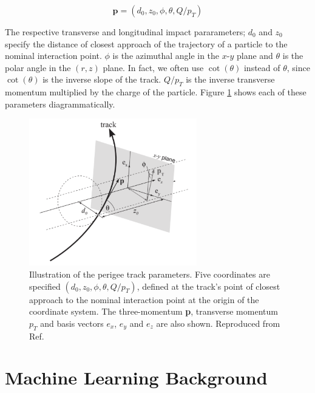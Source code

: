 \begin{equation}\label{perigee}
\textbf{p} = (d_0, z_0, \phi, \theta, Q/p_T)
\end{equation}

The respective transverse and longitudinal impact pararameters; $d_0$ and $z_0$ specify the distance of closest approach of the trajectory of a particle to the nominal interaction point. $\phi$ is the azimuthal angle in the $x$-$y$ plane and $\theta$ is the polar angle in the $(r,z)$ plane. In fact, we often use $\cot(\theta)$ instead of $\theta$, since $\cot(\theta)$ is the inverse slope of the track. $Q/p_T$ is the inverse transverse momentum multiplied by the charge of the particle. Figure \ref{fig:track-parameters-perigee} shows each of these parameters diagrammatically.


\begin{figure}[!htbp]
  \centering
  \includegraphics[width=0.65\textwidth]{images/3-track-reconstruction/track_params.pdf}
  \caption{Illustration of the perigee track parameters. Five coordinates are specified $(d_0, z_0, \phi, \theta, Q/p_T)$, defined at the track’s point of closest approach to the nominal interaction point at the origin of the coordinate system. The three-momentum \textbf{p}, transverse momentum $p_T$ and basis vectors $e_x$, $e_y$ and $e_z$ are also shown. Reproduced from Ref. \cite{atlastrackingdocs}
  }
  \label{fig:track-parameters-perigee}
\end{figure}






\section{Machine Learning Background}
\label{ml-background}

